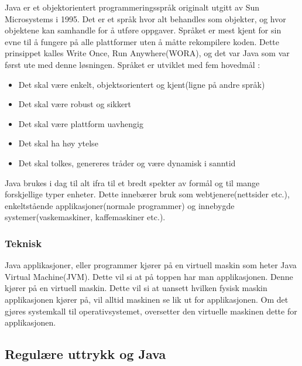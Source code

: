 \documentclass[../main.tex]{subfiles}
\begin{document}
Java er et objektorientert programmeringsspråk originalt utgitt av Sun Microsystems i 1995. Det er et språk hvor alt behandles som objekter, og hvor objektene kan samhandle for å utføre oppgaver. Språket er mest kjent for sin evne til å fungere på alle plattformer uten å måtte rekompilere koden. Dette prinsippet kalles Write Once, Run Anywhere(WORA), og det var Java som var først ute med denne løsningen. 
Språket er utviklet med fem hovedmål :
\begin{itemize}
\item Det skal være enkelt, objektsorientert og kjent(ligne på andre språk)
\item Det skal være robust og sikkert
\item Det skal være plattform uavhengig
\item Det skal ha høy ytelse
\item Det skal tolkes, genereres tråder og være dynamisk i sanntid
\end{itemize}
Java brukes i dag til alt ifra til et bredt spekter av formål og til mange forskjellige typer enheter. Dette innebærer bruk som webtjenere(nettsider etc.), enkeltstående applikasjoner(normale programmer) og innebygde systemer(vaskemaskiner, kaffemaskiner etc.). 

\subsubsection{Teknisk}

Java applikasjoner, eller programmer kjører på en virtuell maskin som heter Java Virtual Machine(JVM). Dette vil si at på toppen har man applikasjonen. Denne kjører på en virtuell maskin. Dette vil si at uansett hvilken fysisk maskin applikasjonen kjører på, vil alltid maskinen se lik ut for applikasjonen. Om det gjøres systemkall til operativsystemet, oversetter den virtuelle maskinen dette for applikasjonen. 

\subsection{Regulære uttrykk og Java}
\end{document}
